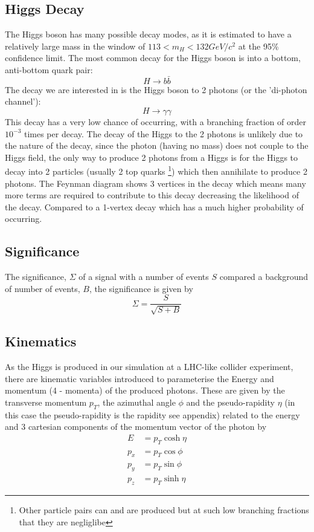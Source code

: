\documentclass{article}
\begin{document}
\subsection{Higgs Decay}
The Higgs boson has many possible decay modes, as it is estimated to have a relatively large mass in the window of $113 < m_H < 132 GeV/c^2$ at the 95\% confidence limit. The most common decay for the Higgs boson is into a bottom, anti-bottom quark pair:
\begin{equation}
H \rightarrow b \bar{b}
\end{equation}
The decay we are interested in is the Higgs boson to 2 photons (or the 'di-photon channel'):
\begin{equation}
H \rightarrow \gamma \gamma
\end{equation}
\cite{HiggsdecayEMback}
This decay has a very low chance of occurring, with a branching fraction of order $10^{-3}$ times per decay. The decay of the Higgs to the 2 photons is unlikely due to the nature of the decay, since the photon (having no mass) does not couple to the Higgs field, the only way to produce 2 photons from a Higgs is for the Higgs to decay into 2 particles (usually 2 top quarks \footnote{Other particle pairs can and are produced but at such low branching fractions that they are negliglibe}) which then annihilate to produce 2 photons. The Feynman diagram shows 3 vertices in the decay which means many more terms are required to contribute to this decay decreasing the likelihood of the decay. Compared to a 1-vertex decay which has a much higher probability of occurring. 
\subsection{Significance}
The significance, $\Sigma$ of a signal with a number of events $S$ compared a background of number of events, $B$, the significance is given by
\begin{equation}
\Sigma = \frac{S}{\sqrt{S + B}} 
\end{equation}
\subsection{Kinematics}
As the Higgs is produced in our simulation at a LHC-like collider experiment, there are kinematic variables introduced to parameterise the Energy and momentum (4 - momenta) of the produced photons. These are given by the transverse momentum $p_T$, the azimuthal angle $\phi$ and the pseudo-rapidity $\eta$ (in this case the pseudo-rapidity is the rapidity see appendix) related to the energy and 3 cartesian components of the momentum vector of the photon by
\begin{align}
E &= p_T \cosh {\eta} \\
p_x &= p_T \cos{\phi} \\
p_y &= p_T \sin{\phi} \\
p_z &= p_T \sinh{\eta}
\end{align}
\end{document}
